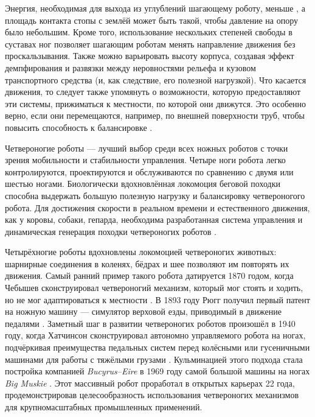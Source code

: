 Энергия, необходимая для выхода из углублений шагающему роботу, меньше \cite{Bekker1962, bekker1969}, а площадь контакта стопы с землёй может быть такой, чтобы давление на опору было небольшим. Кроме того, использование нескольких степеней свободы в суставах ног позволяет шагающим роботам менять направление движения без проскальзывания. Также можно варьировать высоту корпуса, создавая эффект демпфирования и развязки между неровностями рельефа и кузовом транспортного средства (и, как следствие, его полезной нагрузкой). Что касается движения, то следует также упомянуть о возможности, которую предоставляют эти системы, прижиматься к местности, по которой они движутся. Это особенно верно, если они перемещаются, например, по внешней поверхности труб, чтобы повысить способность к балансировке \cite{Kaneko2002}.

Четвероногие роботы --- лучший выбор среди всех ножных роботов с точки зрения мобильности и стабильности управления. Четыре ноги робота легко контролируются, проектируются и обслуживаются по сравнению с двумя или шестью ногами. Биологически вдохновлённая локомоция беговой походки способна выдержать большую полезную нагрузку и балансировку четвероногого робота. Для достижения скорости в реальном времени и естественного движения, как у коровы, собаки, гепарда, необходима разработанная система управления и динамическая генерация походки четвероногих роботов \cite{gonccalves2013}.

Четырёхногие роботы вдохновлены локомоцией четвероногих животных: шарнирные соединения в коленях, бёдрах и шее позволяют им повторять их движения. Самый ранний пример такого робота датируется 1870 годом, когда Чебышев сконструировал четвероногий механизм, который мог стоять и ходить, но не мог адаптироваться к местности \cite{Cheb1948}. В 1893 году Рюгг получил первый патент на ножную машину --- симулятор верховой езды, приводимый в движение педалями \cite{patent}. Заметный шаг в развитии четвероногих роботов произошёл в 1940 году, когда Хатчинсон сконструировал автономно управляемого робота на ногах, подчёркивая преимущества педальных систем перед колёсными или гусеничными машинами для работы с тяжёлыми грузами \cite{Hutchinson1967}.  Кульминацией этого подхода стала постройка компанией \textit{Bucyrus--Eire} в 1969 году самой большой машины на ногах \textit{Big Muskie} \cite{haddock2001extreme}. Этот массивный робот проработал в открытых карьерах 22 года, продемонстрировав целесообразность использования четвероногих механизмов для крупномасштабных промышленных применений.

